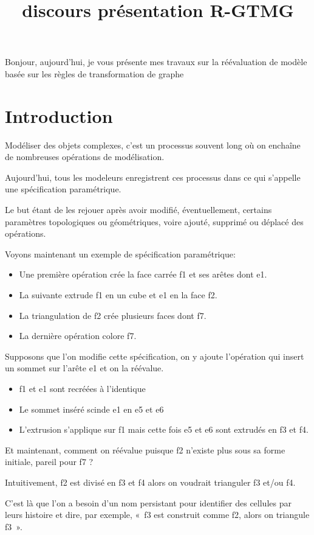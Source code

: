\documentclass[11pt]{article}
\date{}
\title{discours présentation R-GTMG}
\begin{document}
\maketitle
Bonjour, aujourd'hui, je vous présente mes travaux sur la réévaluation
de modèle basée sur les règles de transformation de graphe
\section{Introduction}
\label{sec:orgded3f04}

Modéliser des objets complexes, c'est un processus souvent long où on enchaîne
de nombreuses opérations de modélisation.

Aujourd'hui, tous les modeleurs enregistrent ces processus dans ce qui s'appelle
une spécification paramétrique.

Le but étant de les rejouer après avoir modifié, éventuellement, certains
paramètres topologiques ou géométriques, voire ajouté, supprimé ou déplacé
des opérations.

Voyons maintenant un exemple de spécification paramétrique:
\begin{itemize}
	\item Une première opération crée la face carrée f1 et ses arêtes dont e1.
	\item La suivante extrude f1 en un cube et e1 en la face f2.
	\item La triangulation de f2 crée plusieurs faces dont f7.
	\item La dernière opération colore f7.
\end{itemize}

Supposons que l'on modifie cette spécification, on y ajoute l'opération qui
insert un sommet sur l'arête e1 et on la réévalue.

\begin{itemize}
	\item f1 et e1 sont recréées à l'identique
	\item Le sommet inséré scinde e1 en e5 et e6
	\item L'extrusion s'applique sur f1 mais cette fois e5 et e6 sont extrudés en f3 et
	      f4.
\end{itemize}

Et maintenant, comment on réévalue puisque f2 n'existe plus sous sa forme initiale,
pareil pour f7 ?

Intuitivement, f2 est divisé en f3 et f4 alors on voudrait trianguler f3 et/ou f4.

C'est là que l'on a besoin d'un nom persistant pour identifier des cellules par leurs histoire et dire, par exemple, «~f3 est construit comme f2, alors on triangule f3~».
\end{document}
